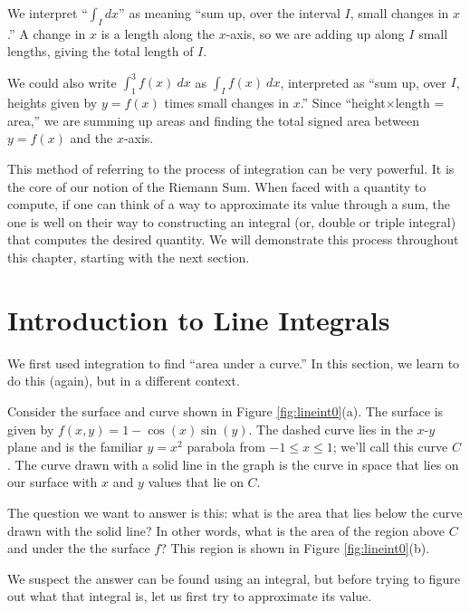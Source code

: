 We interpret ``$\int_I dx$'' as meaning ``sum up, over the interval $I$, small changes in $x$.'' A change in $x$ is a length along the $x$-axis, so we are adding up along $I$ small lengths, giving the total length of $I$. 

We could also write $\int_1^3f(x)\ dx$ as $\int_I f(x)\ dx$, interpreted as ``sum up, over $I$, heights given by $y = f(x)$ times small changes in $x$.'' Since ``height$\times$length = area,'' we are summing up areas and finding the total signed area between $y = f(x)$ and the $x$-axis. 

This method of referring to the process of integration can be very powerful. It is the core of our notion of the Riemann Sum. When faced with a quantity to compute, if one can think of a way to approximate its value through a sum, the one is well on their way to constructing an integral (or, double or triple integral) that computes the desired quantity. We will demonstrate this process throughout this chapter, starting with the next section.

\section{Introduction to Line Integrals}\label{sec:line_int_intro}
We first used integration to find ``area under a curve.'' In this section, we learn to do this (again), but in a different context.

Consider the surface and curve shown in Figure \ref{fig:lineint0}(a). The surface is given by $f(x,y)=1-\cos(x)\sin(y)$. The dashed curve lies in the $x$-$y$ plane and is the familiar $y=x^2$ parabola from $-1\leq x\leq1$; we'll call this curve $C$. The curve drawn with a solid line in the graph is the curve in space that lies on our surface with $x$ and $y$ values that lie on $C$. 

The question we want to answer is this: what is the area that lies below the curve drawn with the solid line? In other words, what is the area of the region above $C$ and under the the surface $f$? This region is shown in Figure \ref{fig:lineint0}(b).

We suspect the answer can be found using an integral, but before trying to figure out what that integral is, let us first try to approximate its value. 

